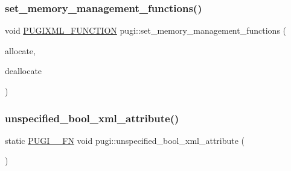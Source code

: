 \mbox{\label{namespacepugi_abc67229fed7dbe24a410d83b9233f916}} 
\subsubsection{\texorpdfstring{set\+\_\+memory\+\_\+management\+\_\+functions()}{set\_memory\_management\_functions()}}
{\footnotesize\ttfamily void \hyperlink{pugixml_8hpp_a3d91f8ab11645e6dac8783d86d152b31}{P\+U\+G\+I\+X\+M\+L\+\_\+\+F\+U\+N\+C\+T\+I\+ON} pugi\+::set\+\_\+memory\+\_\+management\+\_\+functions (\begin{DoxyParamCaption}\item[{\hyperlink{namespacepugi_a7b2d97e5b6040fe323d342268b6ffd4b}{allocation\+\_\+function}}]{allocate,  }\item[{\hyperlink{namespacepugi_a3587161b9f8d7ac4ac2d6a45b82462be}{deallocation\+\_\+function}}]{deallocate }\end{DoxyParamCaption})}

\mbox{\label{namespacepugi_a8effe3a6fc7cc9c1cf2550739dbdc438}} 
\subsubsection{\texorpdfstring{unspecified\+\_\+bool\+\_\+xml\+\_\+attribute()}{unspecified\_bool\_xml\_attribute()}}
{\footnotesize\ttfamily static \hyperlink{pugixml_8cpp_a82c335af3ca48cdb209c506bf8dd6ad2}{P\+U\+G\+I\+\_\+\+\_\+\+FN} void pugi\+::unspecified\+\_\+bool\+\_\+xml\+\_\+attribute (\begin{DoxyParamCaption}\item[{\hyperlink{classpugi_1_1xml__attribute}{xml\+\_\+attribute} $\ast$$\ast$$\ast$}]{ }\end{DoxyParamCaption})\hspace{0.3cm}{\ttfamily [static]}}

\mbox{\label{namespacepugi_a487b2e720a3808d6fd5730d7c97bcdac}} 
